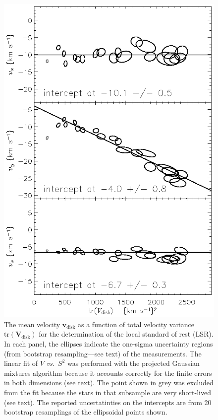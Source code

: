 \documentclass[12pt,preprint]{aastex}
\newcommand{\latin}[1]{\textit{#1}}
\newcommand{\vs}{\latin{vs.}}
\renewcommand{\vec}[1]{\mathbf{#1}} %
\newcommand{\vv}{\vec{v}}
\newcommand{\vvdisk}{\vv_\mathrm{disk}}
\newcommand{\ten}[1]{\mathbf{#1}} %
\newcommand{\VV}{\ten{V}}
\newcommand{\VVdisk}{\VV_\mathrm{\!disk}}
\newcommand{\tr}{\mathrm{tr}}                 %
\begin{document}
\clearpage
\begin{figure}
\includegraphics{lsr_1_lsr.ps}
\caption{The mean velocity $\vvdisk$ as a function of total velocity
variance $\tr(\VVdisk)$ for the determination of the local standard of
rest (LSR).  In each panel, the ellipses indicate the one-sigma
uncertainty regions (from bootstrap resampling---see text) of the
measurements.  The linear fit of $V$ \vs\ $S^2$ was performed with the
projected Gaussian mixtures algorithm because it accounts correctly
for the finite errors in both dimensions (see text).  The point shown
in grey was excluded from the fit because the stars in that subsample
are very short-lived (see text).  The reported uncertatinties on the
intercepts are from 20 bootstrap resamplings of the ellipsoidal points
shown.\label{fig:lsr_1_lsr}}
\end{figure}
\end{document}
